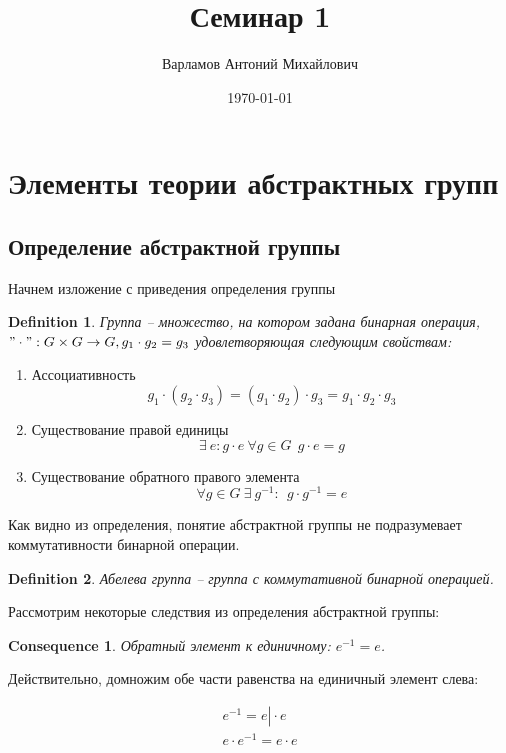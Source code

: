 \documentclass[10pt,a4paper]{article}
\title{Семинар 1}
\date{\today}
\author{Варламов Антоний Михайлович}
\newtheorem{defin}{Definition}
\newtheorem{cons}{Consequence}
\begin{document}
	\maketitle
	\tableofcontents
	
	\section{Элементы теории абстрактных групп}
	
		\subsection{Определение абстрактной группы}
		
		Начнем изложение с приведения определения группы
		
		\begin{defin}
			Группа -- множество, на котором задана бинарная операция, 
			$"\cdot": G\times G \rightarrow G, g_{1}\cdot g_{2} = g_{3}$
			удовлетворяющая следующим свойствам:
		\end{defin}
		
		\begin{enumerate}
			\item Ассоциативность $$g_{1}\cdot\left(g_{2}\cdot g_{3}\right) = \left(g_{1}\cdot g_{2}\right)\cdot g_{3} = g_{1}\cdot g_{2}\cdot g_{3}$$
			\item Существование правой единицы $$\exists \  e: g\cdot e \ \forall g \in G  \ \ g\cdot e = g$$
			\item Существование обратного правого элемента $$\forall g \in G \  \exists \  g^{-1}: \ \  g\cdot g^{-1} = e$$ 
		\end{enumerate}
		
		Как видно из определения, понятие абстрактной группы не подразумевает коммутативности бинарной операции.
		
		\begin{defin}
			Абелева группа -- группа с коммутативной бинарной операцией.
		\end{defin}
		
		Рассмотрим некоторые следствия из определения абстрактной группы:
		
		\begin{cons}
			Обратный элемент к единичному: $e^{-1} = e$.
		\end{cons}		
		
			Действительно, домножим обе части равенства на единичный элемент 
			слева:
			
			\begin{align}
				e^{-1} = e \left.\right| \cdot e \\			
				e\cdot e^{-1} = e\cdot e	
			\end{align}
			
\end{document}
